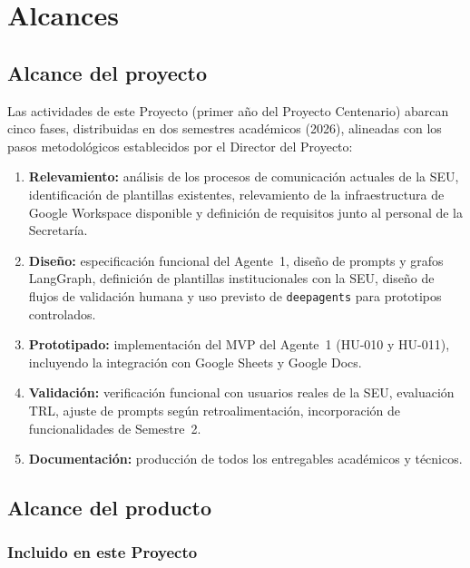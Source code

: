 \documentclass[a4paper, 12pt]{article}
\begin{document}
\section{Alcances}

\subsection{Alcance del proyecto}

Las actividades de este Proyecto (primer a\~no del Proyecto Centenario) abarcan cinco fases, distribuidas en dos semestres acad\'emicos (2026), alineadas con los pasos metodol\'ogicos establecidos por el Director del Proyecto:

\begin{enumerate}[label=\arabic*.]
  \item \textbf{Relevamiento:} an\'alisis de los procesos de comunicaci\'on actuales de la \ac{SEU}, identificaci\'on de plantillas existentes, relevamiento de la infraestructura de Google Workspace disponible y definici\'on de requisitos junto al personal de la Secretar\'ia.
  \item \textbf{Dise\~no:} especificaci\'on funcional del Agente~1, dise\~no de prompts y grafos LangGraph, definici\'on de plantillas institucionales con la \ac{SEU}, dise\~no de flujos de validaci\'on humana y uso previsto de \texttt{deepagents} para prototipos controlados.
  \item \textbf{Prototipado:} implementaci\'on del \ac{MVP} del Agente~1 (HU-010 y HU-011), incluyendo la integraci\'on con Google Sheets y Google Docs.
  \item \textbf{Validaci\'on:} verificaci\'on funcional con usuarios reales de la \ac{SEU}, evaluaci\'on \ac{TRL}, ajuste de prompts seg\'un retroalimentaci\'on, incorporaci\'on de funcionalidades de Semestre~2.
  \item \textbf{Documentaci\'on:} producci\'on de todos los entregables acad\'emicos y t\'ecnicos.
\end{enumerate}

\subsection{Alcance del producto}

\subsubsection{Incluido en este Proyecto}
\end{document}
